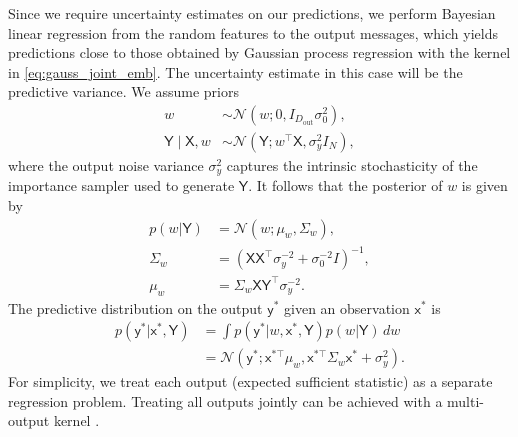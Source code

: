 \documentclass[english]{article}
\theoremstyle{plain}
\theoremstyle{plain}
\begin{document}
Since we require uncertainty estimates on our predictions,
we perform Bayesian linear regression from the random features to the output messages,
which yields predictions close to those obtained by Gaussian process regression
with the kernel in \eqref{eq:gauss_joint_emb}.
The uncertainty estimate in this case will be the predictive 
variance.
We assume priors 
\begin{align}
w & \sim\mathcal{N}\left(w;0,I_{D_\mathrm{out}}\sigma_{0}^{2}\right), \\
\mathsf{Y} \mid \mathsf{X},w & \sim\mathcal{N}\left(\mathsf{Y};w^{\top} \mathsf{X},\sigma_{y}^{2}I_{N}\right),
\end{align}
%
where the output noise variance $\sigma_{y}^{2}$ captures the intrinsic
stochasticity of the importance sampler used to generate $\mathsf{Y}$. It
follows that the posterior of $w$ is given by \citet{Bishop2006}
%
\begin{align}
p(w | \mathsf{Y}) & =\mathcal{N}(w;\mu_{w},\Sigma_{w}), \\
\Sigma_{w} & = \left( \mathsf{X} \mathsf{X}^{\top}\sigma_{y}^{-2}+\sigma_{0}^{-2}I \right)^{-1}, \\
\mu_{w} & =\Sigma_{w} \mathsf{X} \mathsf{Y}^{\top}\sigma_{y}^{-2}.
\end{align}
The predictive distribution on the output $\mathsf{y}^{*}$ given an 
observation $\mathsf{x}^{*}$ is
%
\begin{align}
p(\mathsf{y}^{*}| \mathsf{x}^{*}, \mathsf{Y}) & =\int  
 p(\mathsf{y}^{*}|w, \mathsf{x}^{*}, \mathsf{Y}) p(w|\mathsf{Y}) \, dw\\
 & =\mathcal{N}\left(\mathsf{y}^{*}; \mathsf{x}^{*\top}\mu_{w}, \mathsf{x}^{*\top}\Sigma_{w} \mathsf{x}^{*}+\sigma_{y}^{2}\right).
\end{align}
%
For simplicity, we treat each output (expected sufficient statistic) as a separate regression problem. 
Treating all outputs jointly can be achieved with a multi-output kernel \citep{Alvarez2011}.
 
\end{document}
